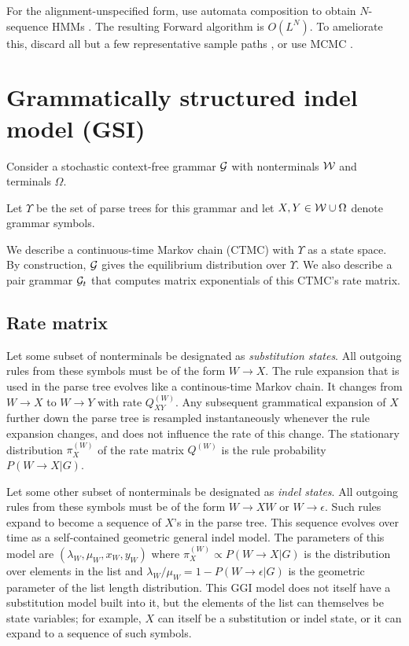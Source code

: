 \documentclass{article}
\begin{document}
For the alignment-unspecified form, use automata composition to obtain $N$-sequence HMMs \cite{SilvestreRyanEtAl2020}.
The resulting Forward algorithm is $O(L^N)$.
To ameliorate this, discard all but a few representative sample paths \cite{WestessonEtAl2012},
or use MCMC \cite{RedelingsSuchard2007}.


\section{Grammatically structured indel model (GSI)}

Consider a stochastic context-free grammar ${\cal G}$
with nonterminals ${\cal W}$ and terminals $\Omega$.

Let $\Upsilon$ be the set of parse trees for this grammar
and let $X,Y \in {\cal W}\cup\Omega$ denote grammar symbols.

We describe a continuous-time Markov chain (CTMC) with $\Upsilon$ as a state space.
By construction, ${\cal G}$ gives the equilibrium distribution over $\Upsilon$.
We also describe a pair grammar ${\cal G}_t$ that computes matrix exponentials of this CTMC's rate matrix.

\subsection{Rate matrix}

Let some subset of nonterminals be designated as {\em substitution states}.
All outgoing rules from these symbols must be of the form $W \to X$.
The rule expansion that is used in the parse tree evolves like a continous-time Markov chain.
It changes from $W \to X$ to $W \to Y$ with rate $Q^{(W)}_{XY}$.
Any subsequent grammatical expansion of $X$ further down the parse tree
is resampled instantaneously whenever the rule expansion changes,
and does not influence the rate of this change.
The stationary distribution $\pi^{(W)}_X$ of the rate matrix $Q^{(W)}$ is the rule probability $P(W \to X|G)$.

Let some other subset of nonterminals be designated as {\em indel states}.
All outgoing rules from these symbols must be of the form $W \to X W$ or $W \to \epsilon$.
Such rules expand to become a sequence of $X$'s in the parse tree.
This sequence evolves over time as a self-contained geometric general indel model.
The parameters of this model are $(\lambda_W, \mu_W, x_W, y_W)$
where $\pi^{(W)}_X \propto P(W \to X|G)$ is the distribution over elements in the list
and $\lambda_W / \mu_W = 1 - P(W \to \epsilon|G)$ is the geometric parameter of the list length distribution.
This GGI model does not itself have a substitution model built into it,
but the elements of the list can themselves be state variables;
for example, $X$ can itself be a substitution or indel state,
or it can expand to a sequence of such symbols.
\end{document}
